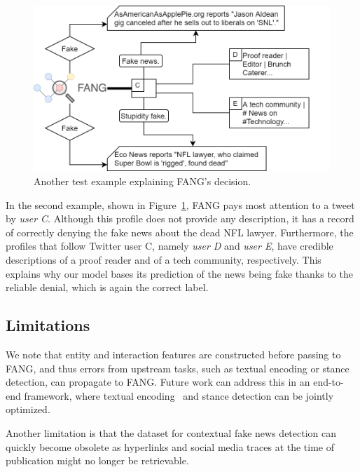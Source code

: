 \documentclass[sigconf]{acmart}
\theoremstyle{definition}
\theoremstyle{hypothesis}
\begin{document}
\begin{figure}[t]
\centering
\includegraphics[scale=0.25]{micro2.png}
\caption{Another test example explaining FANG's decision.}
\label{fig:micro_2}
\end{figure}

In the second example, shown in Figure~\ref{fig:micro_2}, 
FANG pays most attention to a tweet by \textit{user C}. Although this profile does not provide any description, it has a record of correctly denying the fake news about the dead NFL lawyer. Furthermore, the profiles that follow Twitter user C, namely \textit{user D} and \textit{user E}, have credible descriptions of 
a proof reader and of a tech community, respectively. 
This explains why our model bases its prediction of the news being fake thanks to the reliable denial, which is again the correct label.

\subsection{Limitations}
We note that entity and interaction features are constructed before passing to FANG, and thus errors from upstream tasks, such as textual encoding or stance detection, can propagate to FANG. Future work can address this in an end-to-end framework, where textual encoding~\cite{devlin2019bert} and stance detection can be jointly optimized.

Another limitation is that the dataset for contextual fake news detection can quickly become obsolete as hyperlinks and social media traces at the time of publication might no longer be retrievable.
\end{document}

